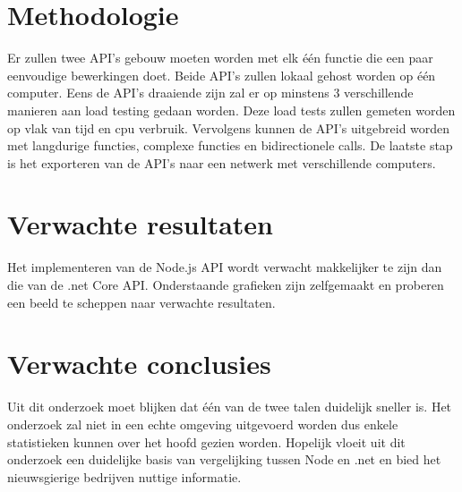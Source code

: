
\section{Methodologie}
\label{sec:methodologie}
Er zullen twee API's gebouw moeten worden met elk één functie die een paar eenvoudige bewerkingen doet. Beide API's zullen lokaal gehost worden op één computer. Eens de API's draaiende zijn zal er op minstens 3 verschillende manieren aan load testing gedaan worden. Deze load tests zullen gemeten worden op vlak van tijd en cpu verbruik. Vervolgens kunnen de API's uitgebreid worden met langdurige functies, complexe functies en bidirectionele calls. De laatste stap is het exporteren van de API's naar een netwerk met verschillende computers. 

\section{Verwachte resultaten}
\label{sec:verwachte_resultaten}
Het implementeren van de Node.js API wordt verwacht makkelijker te zijn dan die van de .net Core API.
Onderstaande grafieken zijn zelfgemaakt en proberen een beeld te scheppen naar verwachte resultaten.



\section{Verwachte conclusies}
\label{sec:verwachte_conclusies}
Uit dit onderzoek moet blijken dat één van de twee talen duidelijk sneller is. Het onderzoek zal niet in een echte omgeving uitgevoerd worden dus enkele statistieken kunnen over het hoofd gezien worden. Hopelijk vloeit uit dit onderzoek een duidelijke basis van vergelijking tussen Node en .net en bied het nieuwsgierige bedrijven nuttige informatie.